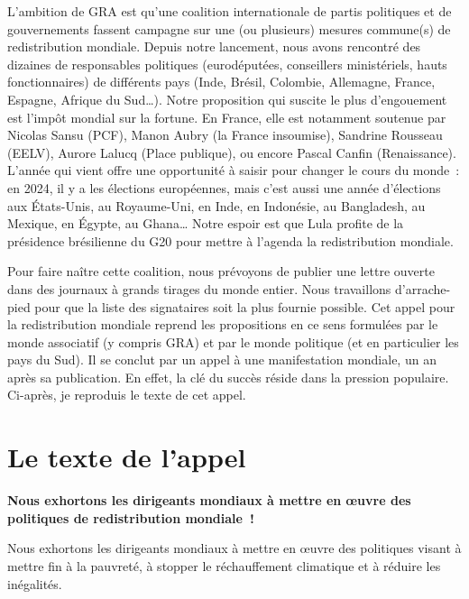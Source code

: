 \documentclass[a5paper,french,openany]{memoir}
\begin{document}
L'ambition de GRA est qu'une coalition internationale de partis politiques et de gouvernements fassent campagne sur une (ou plusieurs) mesures commune(s) de redistribution mondiale. Depuis notre lancement, nous avons rencontré des dizaines de responsables politiques (eurodéputé\textperiodcentered{}e\textperiodcentered{}s, conseillers ministériels, hauts fonctionnaires) de différents pays (Inde, Brésil, Colombie, Allemagne, France, Espagne, Afrique du Sud\dots). Notre proposition qui suscite le plus d'engouement est l'impôt mondial sur la fortune. En France, elle est notamment soutenue par Nicolas Sansu (PCF), Manon Aubry (la France insoumise), Sandrine Rousseau (EELV), Aurore Lalucq (Place publique), ou encore Pascal Canfin (Renaissance). L'année qui vient offre une opportunité à saisir pour changer le cours du monde~: en 2024, il y a les élections européennes, mais c'est aussi une année d'élections aux États-Unis, au Royaume-Uni, en Inde, en Indonésie, au Bangladesh, au Mexique, en Égypte, au Ghana\dots{} Notre espoir est que Lula profite de la présidence brésilienne du G20 pour mettre à l'agenda la redistribution mondiale. 

Pour faire naître cette coalition, nous prévoyons de publier une lettre ouverte dans des journaux à grands tirages du monde entier. Nous travaillons d'arrache-pied pour que la liste des signataires soit la plus fournie possible. Cet appel pour la redistribution mondiale reprend les propositions en ce sens formulées par le monde  associatif (y compris GRA) et par le monde politique (et en particulier les pays du Sud). Il se conclut par un appel à une manifestation mondiale, un an après sa publication. En effet, la clé du succès réside dans la pression populaire. Ci-après, je reproduis le texte de cet appel.%

\section{Le texte de l'appel}

\begin{center}
\textbf{Nous exhortons les dirigeants mondiaux à mettre en œuvre des politiques de redistribution mondiale~!}
\end{center}

Nous exhortons les dirigeants mondiaux à mettre en œuvre des politiques visant à mettre fin à la pauvreté, à stopper le réchauffement climatique et à réduire les inégalités. 
\end{document}
